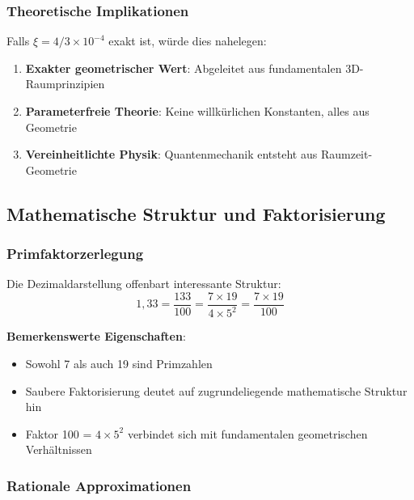 \documentclass[12pt,a4paper]{article}
\newcommand{\xipar}{\ensuremath{\xi}}
\newcommand{\mytimes}{\ensuremath{\times}}
\begin{document}
	\subsubsection{Theoretische Implikationen}
	\label{subsubsec:theoretische_implikationen}
	
	Falls $\xipar = 4/3 \mytimes 10^{-4}$ exakt ist, würde dies nahelegen:
	\begin{enumerate}
		\item \textbf{Exakter geometrischer Wert}: Abgeleitet aus fundamentalen 3D-Raumprinzipien
		\item \textbf{Parameterfreie Theorie}: Keine willkürlichen Konstanten, alles aus Geometrie
		\item \textbf{Vereinheitlichte Physik}: Quantenmechanik entsteht aus Raumzeit-Geometrie
	\end{enumerate}
	
	\subsection{Mathematische Struktur und Faktorisierung}
	\label{subsec:mathematische_struktur}
	
	\subsubsection{Primfaktorzerlegung}
	\label{subsubsec:primfaktorzerlegung}
	
	Die Dezimaldarstellung offenbart interessante Struktur:
	\begin{equation}
		1,33 = \frac{133}{100} = \frac{7 \mytimes 19}{4 \mytimes 5^2} = \frac{7 \mytimes 19}{100}
		\label{eq:faktorisierung}
	\end{equation}
	
	\textbf{Bemerkenswerte Eigenschaften}:
	\begin{itemize}
		\item Sowohl 7 als auch 19 sind Primzahlen
		\item Saubere Faktorisierung deutet auf zugrundeliegende mathematische Struktur hin
		\item Faktor 100 = $4 \mytimes 5^2$ verbindet sich mit fundamentalen geometrischen Verhältnissen
	\end{itemize}
	
	\subsubsection{Rationale Approximationen}
	\label{subsubsec:rationale_approximationen}
	
\end{document}
